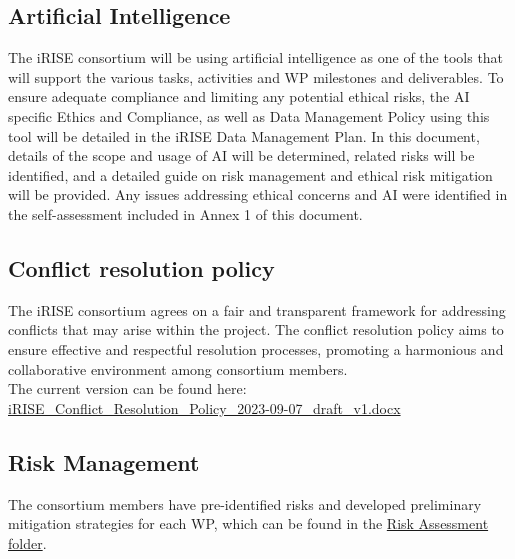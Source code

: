 \documentclass[
]{article}
\begin{document}
\hypertarget{artificial-intelligence}{%
\subsection{Artificial Intelligence}\label{artificial-intelligence}}

The iRISE consortium will be using artificial intelligence as one of the tools that will support the various tasks, activities and WP milestones and deliverables. To ensure adequate compliance and limiting any potential ethical risks, the AI specific Ethics and Compliance, as well as Data Management Policy using this tool will be detailed in the iRISE Data Management Plan. In this document, details of the scope and usage of AI will be determined, related risks will be identified, and a detailed guide on risk management and ethical risk mitigation will be provided.
Any issues addressing ethical concerns and AI were identified in the self-assessment included in Annex 1 of this document.

\hypertarget{conflict-resolution-policy}{%
\subsection{Conflict resolution policy}\label{conflict-resolution-policy}}

The iRISE consortium agrees on a fair and transparent framework for addressing conflicts that may arise within the project. The conflict resolution policy aims to ensure effective and respectful resolution processes, promoting a harmonious and collaborative environment among consortium members.\\
The current version can be found here: \href{https://charitede.sharepoint.com/:w:/r/sites/iRISE/Shared\%20Documents/WP7/Project\%20Management/iRISE_Conflict_Resolution_Policy_2023-09-07_draft_v1.docx?d=w8c6c4a152a9046dab8a06017a0b97944\&csf=1\&web=1\&e=Nhj4lf}{iRISE\_Conflict\_Resolution\_Policy\_2023-09-07\_draft\_v1.docx}

\hypertarget{risk-management}{%
\subsection{Risk Management}\label{risk-management}}

The consortium members have pre-identified risks and developed preliminary mitigation strategies for each WP, which can be found in the \href{https://charitede.sharepoint.com/:f:/r/sites/iRISE/Shared\%20Documents/WP7/Project\%20Management/Risk\%20Assessments?csf=1\&web=1\&e=v2Nm3v}{Risk Assessment folder}.
\end{document}
